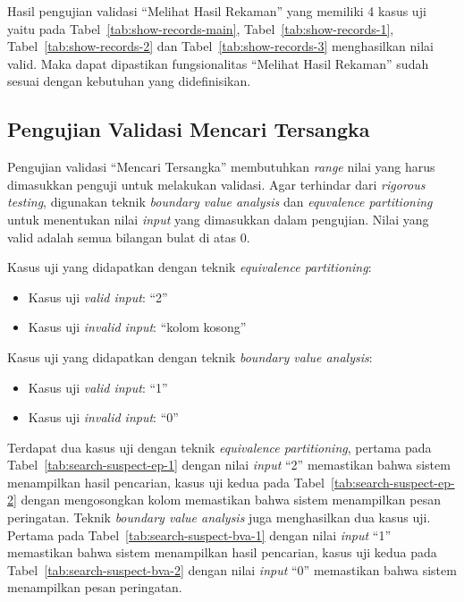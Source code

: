 Hasil pengujian validasi ``Melihat Hasil Rekaman'' yang memiliki 4 kasus uji
yaitu pada Tabel~\ref{tab:show-records-main}, Tabel~\ref{tab:show-records-1},
Tabel~\ref{tab:show-records-2} dan Tabel~\ref{tab:show-records-3} menghasilkan
nilai valid. Maka dapat dipastikan fungsionalitas ``Melihat Hasil Rekaman''
sudah sesuai dengan kebutuhan yang didefinisikan.

\subsection{Pengujian Validasi Mencari Tersangka}

Pengujian validasi ``Mencari Tersangka'' membutuhkan
\emph{range} nilai yang harus dimasukkan penguji untuk melakukan
validasi. Agar terhindar dari \emph{rigorous testing}, digunakan
teknik \emph{boundary value analysis} dan \emph{equvalence
  partitioning} untuk menentukan nilai \emph{input} yang dimasukkan dalam
pengujian. Nilai yang valid adalah semua bilangan bulat di atas 0.\newline

\noindent
Kasus uji yang didapatkan dengan teknik \emph{equivalence partitioning}:

\begin{itemize}
\item Kasus uji \emph{valid input}: ``2''
\item Kasus uji \emph{invalid input}: ``kolom kosong''
\end{itemize}

\noindent
Kasus uji yang didapatkan dengan teknik \emph{boundary value analysis}:

\begin{itemize}
\item Kasus uji \emph{valid input}: ``1''
\item Kasus uji \emph{invalid input}: ``0''
\end{itemize}

Terdapat dua kasus uji dengan teknik \emph{equivalence partitioning},
pertama pada Tabel~\ref{tab:search-suspect-ep-1} dengan nilai \emph{input} ``2''
memastikan bahwa sistem menampilkan hasil pencarian, kasus uji
kedua pada Tabel~\ref{tab:search-suspect-ep-2} dengan mengosongkan
kolom memastikan bahwa sistem menampilkan pesan peringatan.
Teknik \emph{boundary value analysis} juga menghasilkan dua kasus uji.
Pertama pada Tabel~\ref{tab:search-suspect-bva-1} dengan nilai \emph{input}
``1'' memastikan bahwa sistem menampilkan hasil pencarian, kasus
uji kedua pada Tabel~\ref{tab:search-suspect-bva-2} dengan nilai \emph{input}
``0'' memastikan bahwa sistem menampilkan pesan peringatan.

